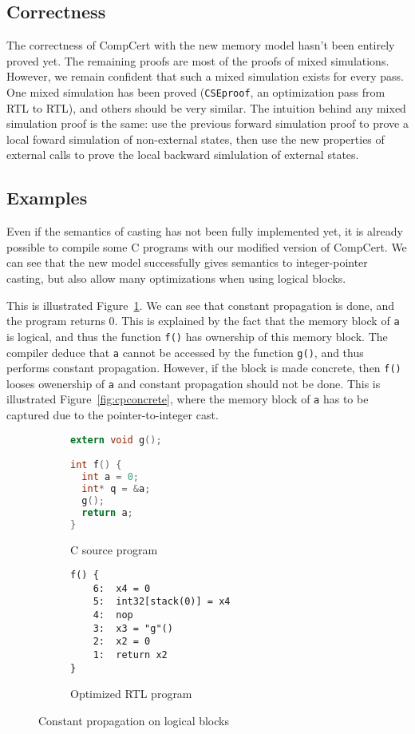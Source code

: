 \label{sec:eval}
\subsection{Correctness}
The correctness of CompCert with the new memory model hasn't been entirely proved yet.
The remaining proofs are most of the proofs of mixed simulations.
However, we remain confident that such a mixed simulation exists for every pass. One mixed simulation has been proved (\texttt{CSEproof}, an optimization pass from RTL to RTL), and others should be very similar. The intuition behind any mixed simulation proof is the same: use the previous forward simulation proof to prove a local foward simulation of non-external states, then use the new properties of external calls to prove the local backward simlulation of external states.


\subsection{Examples}
Even if the semantics of casting has not been fully implemented yet, it is already possible to compile some C programs with our modified version of CompCert. We can see that the new model successfully gives semantics to integer-pointer casting, but also allow many optimizations when using logical blocks.

This is illustrated Figure~\ref{fig:cplogical}. We can see that constant propagation is done, and the program returns 0. This is explained by the fact that the memory block of \texttt{a} is logical, and thus the function \texttt{f()} has ownership of this memory block. The compiler deduce that \texttt{a} cannot be accessed by the function \texttt{g()}, and thus performs constant propagation.
However, if the block is made concrete, then \texttt{f()} looses owenership of \texttt{a} and constant propagation should not be done. This is illustrated Figure~\ref{fig:cpconcrete}, where the memory block of \texttt{a} has to be captured due to the pointer-to-integer cast.

\begin{figure}
\begin{subfigure}{.48\textwidth}
  \begin{lstlisting}[language=C]
extern void g();

int f() {
  int a = 0;
  int* q = &a;
  g();
  return a;
}
\end{lstlisting}
  \caption{C source program}
\end{subfigure}
\begin{subfigure}{.48\textwidth}
  \begin{lstlisting}
f() {
    6:	x4 = 0
    5:	int32[stack(0)] = x4
    4:	nop
    3:	x3 = "g"()
    2:	x2 = 0
    1:	return x2
}
\end{lstlisting}
  \caption{Optimized RTL program}
\end{subfigure}
\caption{Constant propagation on logical blocks}
\label{fig:cplogical}
\end{figure}

